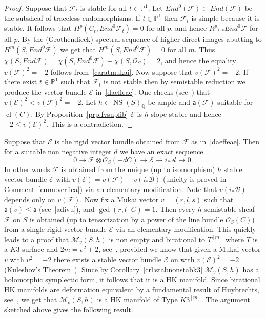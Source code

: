 \documentclass[11pt]{amsart}
\newcommand{\PP}{{\mathbb P}}
\newcommand{\QQ}{{\mathbb Q}}
\let\mathcal\mathscr
\def\cA{\mathcal{A}}
\def\cB{\mathcal{B}}
\def\cE{\mathcal{E}}
\def\cF{\mathcal{F}}
\def\cM{\mathcal{M}}
\def\cO{\mathcal{O}}
\DeclareMathOperator{\cl}{cl}
\DeclareMathOperator{\NS}{NS}
\def\lra{\longrightarrow}
\theoremstyle{definition}
\theoremstyle{remark}
\begin{document}
\begin{proof}
%
Suppose that $\cF_t$ is stable for all $t\in\PP^1$. Let $End^0(\cF)\subset End(\cF)$ be the subsheaf of traceless endomorphisms. If  $t\in\PP^1$ then $\cF_t$ is simple because it is 
stable. It follows that $H^p(C_t,End^0\cF_t)=0$ for all $p$, and hence $R^p\pi_{*}End^0\cF$ for all $p$. By the (Grothendieck) spectral sequence of higher direct images abutting to $H^m(S,End^0\cF)$ we get that $H^m(S,End^0\cF)=0$ for all $m$. Thus 
$\chi(S,End\cF)=\chi(S,End^0\cF)+\chi(S,\cO_S)=2$, and hence the equality $v(\cF)^2=-2$ follows from~\eqref{caratmukai}. Now suppose that $v(\cF)^2=-2$. If there exist $t\in\PP^1$  such that $\cF_t$  is not stable then by semistable reduction we produce the vector bundle $\cE$ in~\eqref{daeffeae}. One checks  (see~\cite[(6.2.5)]{og:fascimod}) that $v(\cE)^2< v(\cF)^2=-2$. Let $h\in\NS(S)_{\QQ}$ be ample and 
 ${\mathsf a}(\cF)$-suitable for $\cl(C)$. 
By Proposition~\ref{prp:fvsupfib} 
 $\cE$ is $h$ slope stable and hence $-2\le v(\cE)^2$. This is   a contradiction.
%
\end{proof}
%
Suppose that $\cE$ is the rigid vector bundle obtained from $\cF$ as in~\eqref{daeffeae}. Then for a suitable non negative integer $d$ we have an exact sequence
%
\begin{equation}\label{daeaeffe}
%
0\lra \cF\otimes\cO_S(-dC)\lra \cE\lra i_{*}\cA\lra 0. 
%
\end{equation}
%
In other words $\cF$ is obtained from the unique (up to isomorphism) $h$ stable vector bundle $\cE$ with $v(\cE)=v(\cF)-v(i_{*}\cB)$ 
(unicity is proved in Comment~\ref{cmm:verfica}) via an elementary modification. Note that $v(i_{*}\cB)$ depends only on $v(\cF)$. 
Now fix a Mukai vector $v=(r,l,s)$ such that ${\mathsf a}(v)\le {\mathsf a}$ (see~\eqref{adivu}), and $\gcd(r,l\cdot C)=1$. Then every $h$ semistable sheaf $\cF$ on $S$ is obtained (up to tensorization by a power of the line bundle $\cO_S(C)$) from a single rigid vector bundle $\cE$ via an elementary modification. This quickly leads to a proof that $\cM_v(S,h)$ is non empty and birational to $T^{[m]}$ where $T$ is a $K3$ surface and $2m=v^2+2$, see~\cite{og:accaduespmod,yoshioka:modfvsupab}, provided we know that given a Mukai vector $v$ with $v^2=-2$ there exists a  stable vector bundle $\cE$ on with $v(\cE)^2=-2$ (Kuleshov's Theorem~\cite{kuleshov:fvecc}). Since by Corollary~\ref{crl:stabnonstabk3}  $\cM_v(S,h)$ has a holomorphic symplectic form, it follows that it is a HK manifold. Since  birational HK  manifolds are deformation equivalent by a fundamental result  of Huybrechts, see~\cite{huy:conokahler}, we get that $\cM_v(S,h)$  is a HK manifold of Type $K3^{[m]}$. The argument sketched above gives the following result.
\end{document}
